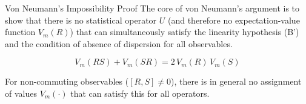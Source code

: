 \begin{frame}{Von Neumann's Impossibility Proof}
  The core of von Neumann's argument is to show that there is no statistical operator $U$ 
  (and therefore no expectation-value function $V_m(R)$) that can simultaneously satisfy 
  the linearity hypothesis (B') and the condition of absence of dispersion for all observables.

  \vspace{0.5cm}

  \[
    V_m(RS) + V_m(SR) = 2\,V_m(R)\,V_m(S)
  \]

  \vspace{0.5cm}

  For non-commuting observables ($[R,S]\neq 0$), there is in general no assignment 
  of values $V_m(\cdot)$ that can satisfy this for all operators.
\end{frame}



